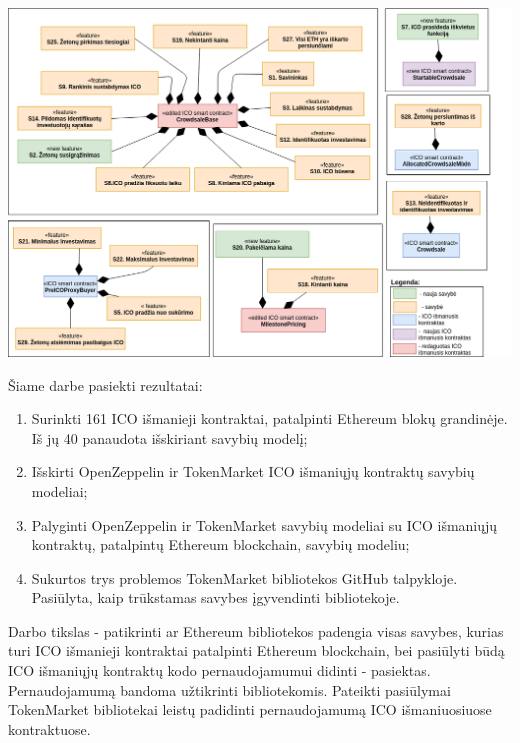 \documentclass{VUMIFPSbakalaurinis}
\begin{document}
\begin{landscape}

\begin{center}
    \includegraphics[scale=0.55]{img/tm+savybes}
    \label{img:tm_features}
\end{center}

\end{landscape}



Šiame darbe pasiekti rezultatai:
\begin{enumerate}[topsep=0pt,itemsep=-1ex,partopsep=1ex,parsep=1ex]
\item Surinkti 161 ICO išmanieji kontraktai, patalpinti Ethereum blokų grandinėje. Iš jų 40 panaudota išskiriant savybių modelį;
\item Išskirti OpenZeppelin ir TokenMarket ICO išmaniųjų kontraktų savybių modeliai;
\item Palyginti OpenZeppelin ir TokenMarket savybių modeliai su ICO išmaniųjų kontraktų, patalpintų Ethereum blockchain, savybių modeliu;
\item Sukurtos trys problemos TokenMarket bibliotekos GitHub talpykloje. Pasiūlyta, kaip trūkstamas savybes įgyvendinti bibliotekoje.
\end{enumerate}

\bigbreak



Darbo tikslas - patikrinti ar Ethereum bibliotekos padengia visas savybes, kurias turi ICO išmanieji kontraktai patalpinti Ethereum blockchain, bei pasiūlyti būdą ICO išmaniųjų kontraktų kodo pernaudojamumui didinti - pasiektas. Pernaudojamumą bandoma užtikrinti bibliotekomis. Pateikti pasiūlymai TokenMarket bibliotekai leistų padidinti pernaudojamumą ICO išmaniuosiuose kontraktuose.
\end{document}

